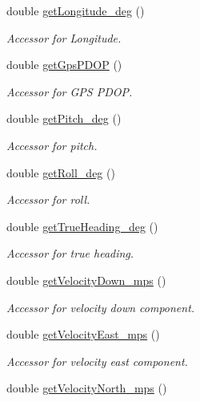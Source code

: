 \begin{DoxyCompactItemize}
double \hyperlink{class_piccolo_telemetry_belief_a16939f4b7c9216cafe97690925eecc6e}{getLongitude\_\-deg} ()
\begin{DoxyCompactList}\small\item\em Accessor for Longitude. \end{DoxyCompactList}\item 
double \hyperlink{class_piccolo_telemetry_belief_a34dc4653d95c018ea50b40c5021e0f33}{getGpsPDOP} ()
\begin{DoxyCompactList}\small\item\em Accessor for GPS PDOP. \end{DoxyCompactList}\item 
double \hyperlink{class_piccolo_telemetry_belief_ad44b003a97513c6b60985305f540c764}{getPitch\_\-deg} ()
\begin{DoxyCompactList}\small\item\em Accessor for pitch. \end{DoxyCompactList}\item 
double \hyperlink{class_piccolo_telemetry_belief_a333b28984f684b9346e548e72afd66c5}{getRoll\_\-deg} ()
\begin{DoxyCompactList}\small\item\em Accessor for roll. \end{DoxyCompactList}\item 
double \hyperlink{class_piccolo_telemetry_belief_a5caa5461c071f2b6e1014b402abda6b5}{getTrueHeading\_\-deg} ()
\begin{DoxyCompactList}\small\item\em Accessor for true heading. \end{DoxyCompactList}\item 
double \hyperlink{class_piccolo_telemetry_belief_a7ca96a97b41a78ef1cf48cb6ed245770}{getVelocityDown\_\-mps} ()
\begin{DoxyCompactList}\small\item\em Accessor for velocity down component. \end{DoxyCompactList}\item 
double \hyperlink{class_piccolo_telemetry_belief_a86daa05446b47f26aa1c01facc077af7}{getVelocityEast\_\-mps} ()
\begin{DoxyCompactList}\small\item\em Accessor for velocity east component. \end{DoxyCompactList}\item 
double \hyperlink{class_piccolo_telemetry_belief_a909d2ca7962638d378277d76ffca6789}{getVelocityNorth\_\-mps} ()

\end{DoxyCompactItemize}
